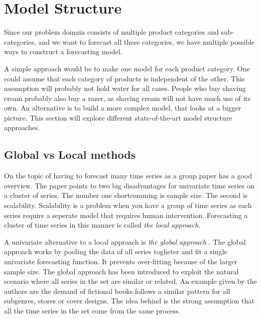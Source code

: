 
\section{Model Structure}
Since our problem domain consists of multiple product categories and sub-categories,
and we want to forecast all these categories,
we have multiple possible ways to construct a forecasting model.

A simple approach would be to make one model for each product category.
One could assume that each category of products is independent of the other.
This assumption will probably not hold water for all cases. People who buy shaving cream probably also buy a razer, as shaving cream will not have much use of its own.
An alternative is to build a more complex model, that looks at a bigger picture.
This section will explore different state-of-the-art model structure approaches.




\subsection{Global vs Local methods}
On the topic of having to forecast many time series as a group \cite{Montero-Manso2021} paper has a good overview.
The paper points to two big disadvantages for univariate time series on a cluster of series.
The number one shortcomming is sample size. The second is scalability.
Scalability is a problem when you have a group of time series as each series require a seperate model
that requires human intervention. Forecasting a cluster of time series in this manner is called
\textit{the local approach.}

A univariate alternative to a local approach is \textit{the global approach}
\citep{Rabanser2020}.
The global approach works by pooling the data of all series togheter and fit a single univariate forecasting function. It prevents over-fitting because of the larger sample size.
The global approach has been introduced to exploit the natural scenario where all series
in the set are similar or related. An example given by the authors are the demand of fictional
books follows a similar pattern for all subgenres, stores or cover designs.
The idea behind is the strong assumption that all the time series in the set
come from the same process.


